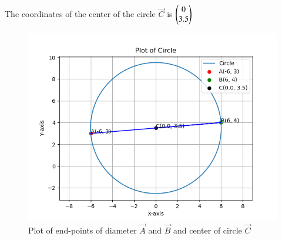 \documentclass[journal]{IEEEtran}
\begin{document}
The coordinates of the center of the circle $\vec{C}$ is $\begin{pmatrix}0\\3.5\end{pmatrix}$

\begin{figure}[h!]
   \centering
   \includegraphics[width=1\linewidth]{figs/plot.png}
   \caption{Plot of end-points of diameter $\vec{A}$ and $\vec{B}$ and center of circle $\vec{C}$}
   \label{stemplot}
\end{figure}
\end{document}
